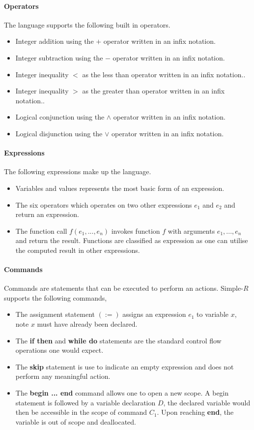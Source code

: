 \documentclass[a4paper,12pt]{report}
\begin{document}
\paragraph{Operators}
The language supports the following built in operators.
\begin{itemize}
  \item Integer addition using the $+$ operator written in an infix notation.
  \item Integer subtraction using the $-$ operator written in an infix notation.
  \item Integer inequality $<$ as the less than operator written in an infix notation..
  \item Integer inequality $>$ as the greater than operator written in an infix notation..
  \item Logical conjunction using the $\wedge$ operator written in an infix 
  notation.
  \item Logical disjunction using the $\vee$ operator written in an infix 
  notation.
\end{itemize}

\paragraph{Expressions} The following expressions make up the language.
\begin{itemize}
  \item Variables and values represents the most basic form of an expression.
  \item The six operators which operates on two other expressions $e_1$ 
  and $e_2$ and return an expression.
  \item The function call $f(e_1,...,e_n)$ invokes function $f$ with arguments 
  $e_1,...,e_n$ and return the result. Functions are classified as expression as 
  one can utilise the computed result in other expressions. 
\end{itemize}

\paragraph{Commands} Commands are statements that can be executed to perform an 
actions. Simple-$R$ supports the following commands,
\begin{itemize}
  \item The assignment statement $(:=)$ assigns an expression $e_1$ to variable 
  $x$, note $x$ must have already been declared. 
  \item The \textbf{if then} and \textbf{while do} statements are the standard 
  control flow operations one would expect.
  \item The \textbf{skip} statement is use to indicate an empty expression and 
  does not perform any meaningful action. 
  \item The \textbf{begin ... end} command allows one to open a new scope. A 
  begin statement is followed by a variable declaration $D$, the declared 
  variable would then be accessible in the scope of command $C_1$. Upon reaching 
  \textbf{end}, the variable is out of scope and deallocated. 
\end{itemize}
\end{document}
